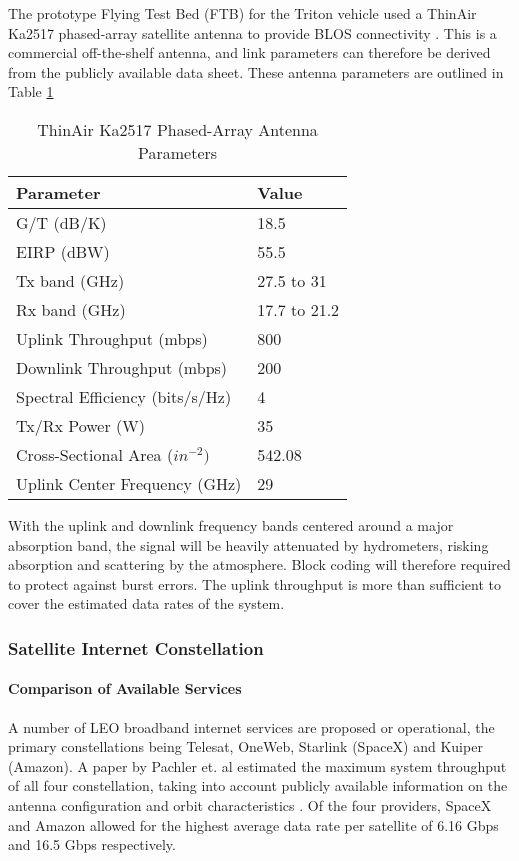 \documentclass[12pt]{article}
\begin{document}
The prototype Flying Test Bed (FTB) for the Triton vehicle used a ThinAir Ka2517 phased-array satellite antenna to provide BLOS connectivity \cite{moench}.  This is a commercial off-the-shelf antenna, and  link parameters can therefore be derived from the publicly available data sheet. These antenna parameters are outlined in Table \ref{table:triton_params}


\begin{table}[H]
\centering
\caption{ThinAir Ka2517 Phased-Array Antenna Parameters}
\label{table:triton_params}
\begin{tabular}{ll}
 \hline
Parameter                       & Value \\
\hline
G/T (dB/K)                      & 18.5       \\
EIRP (dBW)                      & 55.5        \\
Tx band (GHz)                   & 27.5 to 31       \\
Rx band (GHz)                   & 17.7 to 21.2       \\
Uplink Throughput (mbps)        & 800       \\
Downlink Throughput (mbps)      & 200       \\
Spectral Efficiency (bits/s/Hz) & 4       \\
Tx/Rx Power (W)                 & 35       \\
Cross-Sectional Area (\(in^{-2})\) & 542.08       \\
Uplink Center Frequency (GHz)   & 29       \\
\hline
\end{tabular}
\end{table}

With the uplink and downlink frequency bands centered around a major absorption band, the signal will be heavily attenuated by hydrometers, risking absorption and scattering by the atmosphere. Block coding will therefore required to protect against burst errors.  The uplink throughput is more than sufficient to cover the estimated data rates of the system.

\subsubsection{Satellite Internet Constellation}
\paragraph{Comparison of Available Services}
A number of LEO broadband internet services are proposed or operational, the primary constellations being Telesat, OneWeb, Starlink (SpaceX) and Kuiper (Amazon). A paper by Pachler et. al estimated the maximum system throughput of all four constellation, taking into account publicly available information on the antenna configuration and orbit characteristics \cite{pachler}. Of the four providers, SpaceX and Amazon allowed for the highest average data rate per satellite of 6.16 Gbps and 16.5 Gbps respectively. 
\end{document}
